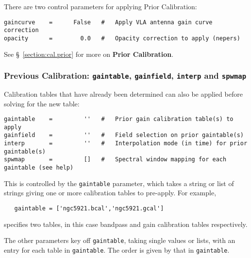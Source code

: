 There are two control parameters for applying Prior Calibration:
\small
\begin{verbatim}
gaincurve    =      False   #   Apply VLA antenna gain curve correction
opacity      =        0.0   #   Opacity correction to apply (nepers)
\end{verbatim}
\normalsize

See \S~\ref{section:cal.prior} for more on {\bf Prior Calibration}.

\subsubsection{Previous Calibration: {\tt gaintable},
{\tt gainfield}, {\tt interp} and {\tt spwmap} }
\label{section:cal.solve.pars.previous}

Calibration tables that have already been determined can also be
applied before solving for the new table:
\small
\begin{verbatim}
gaintable    =         ''   #   Prior gain calibration table(s) to apply
gainfield    =         ''   #   Field selection on prior gaintable(s)
interp       =         ''   #   Interpolation mode (in time) for prior gaintable(s)
spwmap       =         []   #   Spectral window mapping for each gaintable (see help)
\end{verbatim}
\normalsize

This is controlled by the {\tt gaintable} parameter, which takes 
a string or list of strings giving one or more calibration tables 
to pre-apply.  For example,

\small
\begin{verbatim}
   gaintable = ['ngc5921.bcal','ngc5921.gcal']
\end{verbatim}
\normalsize
specifies two tables, in this case bandpass and gain calibration tables
respectively.

The other parameters key off {\tt gaintable}, taking single values or
lists, with an entry for each table in {\tt gaintable}.  The order is
given by that in {\tt gaintable}.

